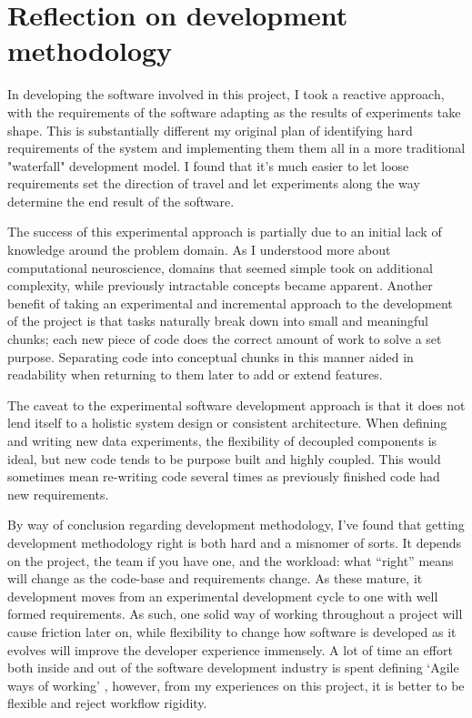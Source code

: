 \section{Reflection on development methodology}

In developing the software involved in this project, I took a reactive approach,
with the requirements of the software adapting as the results of experiments
take shape. This is substantially different my original plan of identifying hard
requirements of the system and implementing them them all in a more traditional
"waterfall" development model. I found that it's much easier to let loose requirements set the direction of travel and
let experiments along the way determine the end result of the software.

The success of this experimental approach is partially due to an initial lack of
knowledge around the problem domain. As I understood more about computational
neuroscience, domains that seemed simple took on additional complexity, while
previously intractable concepts became apparent. Another benefit of taking an experimental and incremental approach to the
development of the project is that tasks naturally break down into small and
meaningful chunks; each new piece of code does the correct amount of work to
solve a set purpose. Separating code into conceptual chunks in this manner aided
in readability when returning to them later to add or extend features.

The caveat to the experimental software development approach is that it does not
lend itself to a holistic system design or consistent architecture. When
defining and writing new data experiments, the flexibility of decoupled
components is ideal, but new code tends to be purpose built and highly coupled.
This would sometimes mean re-writing code several times as previously finished
code had new requirements.

By way of conclusion regarding development methodology, I’ve found that getting
development methodology right is both hard and a misnomer of sorts. It depends
on the project, the team if you have one, and the workload: what “right” means
will change as the code-base and requirements change. As these mature, it
development moves from an experimental development cycle to one with well formed
requirements. As such, one solid way of working throughout a project will cause
friction later on, while flexibility to change how software is developed as it
evolves will improve the developer experience immensely. A lot of time an effort both inside and out of the software development industry
is spent defining `Agile ways of working' \autocite{spolsky_you_2006}, however,
from my experiences on this project, it is better to be flexible and reject
workflow rigidity.

